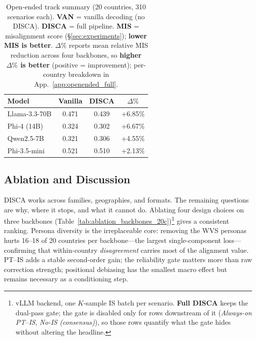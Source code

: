\documentclass{article}
\providecommand{\gain}{}\renewcommand{\gain}[1]{\textcolor{improvegreen}{#1}}
\begin{document}
\begin{table}[t]

\centering\small
\caption{Open-ended track summary (20 countries, 310 scenarios each). \textbf{VAN} = vanilla decoding (no DISCA). \textbf{DISCA} = full pipeline. \textbf{MIS} = misalignment score (\S\ref{sec:experiments}); \textbf{lower MIS is better}. $\Delta\%$ reports mean relative MIS reduction across four backbones, so \textbf{higher $\Delta\%$ is better} (positive = improvement); per-country breakdown in 
App.~\ref{app:openended_full}.}
\label{tab:openended_summary}
\vspace{0.1cm}
\setlength{\tabcolsep}{5pt}
\begin{tabular}{@{}lccc@{}}
\toprule
\textbf{Model} & \textbf{Vanilla} & \textbf{DISCA} & \boldmath$\Delta\%$ \\
\midrule
Llama-3.3-70B   & 0.471 & 0.439 & \gain{+6.85\%} \\
Phi-4 (14B)     & 0.324 & 0.302 & \gain{+6.67\%} \\
Qwen2.5-7B      & 0.321 & 0.306 & \gain{+4.55\%} \\
Phi-3.5-mini    & 0.521 & 0.510 & \gain{+2.13\%} \\
\bottomrule
\end{tabular}
\vspace{-0.3cm}
\end{table}

\vspace{-0.2cm}
\subsection{Ablation and Discussion}
\label{sec:discussion}
\label{sec:ablation}

DISCA works across families, geographies, and formats. The remaining questions are why, where it stops, and what it cannot do.
%
Ablating four design choices on three backbones (Table~\ref{tab:ablation_backbones_20c})\footnote{vLLM backend, one $K$-sample IS batch per scenario. \textbf{Full DISCA} keeps the dual-pass gate; the gate is disabled only for rows downstream of it (\textit{Always-on PT--IS}, \textit{No-IS (consensus)}), so those rows quantify what the gate hides without altering the headline.} gives a consistent ranking. Persona diversity is the irreplaceable core: removing the WVS personas hurts 16--18 of 20 countries per backbone---the largest single-component loss---confirming that within-country \emph{disagreement} carries most of the alignment value. PT--IS adds a stable second-order gain; the reliability gate matters more than raw correction strength; positional debiasing has the smallest macro effect but remains necessary as a conditioning step.
\end{document}
